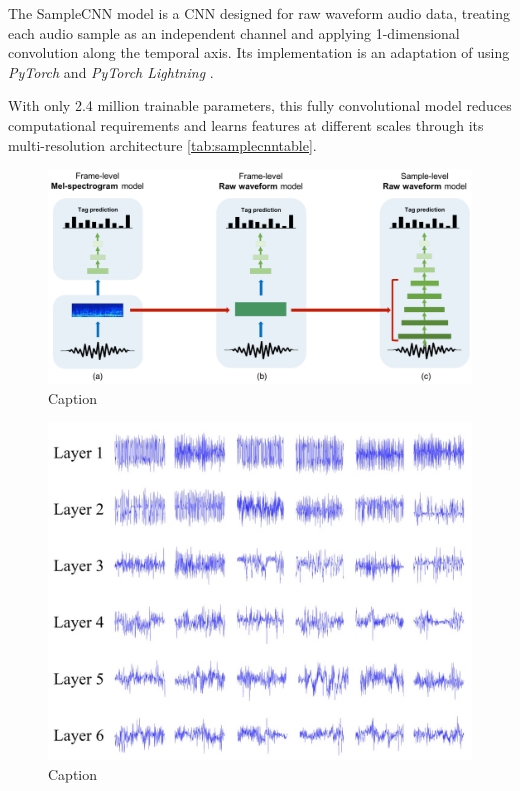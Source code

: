 The SampleCNN model \cite{Lee2018SampleCNN:Classification} is a CNN designed for raw waveform audio data, treating each audio sample as an independent channel and applying 1-dimensional convolution along the temporal axis. Its implementation is an adaptation of \cite{CLMR2021} using \textit{PyTorch} \cite{Paszke2019PyTorch:Library} and \textit{PyTorch Lightning} \cite{PyTorchDocumentation}.

With only 2.4 million trainable parameters, this fully convolutional model reduces computational requirements and learns features at different scales through its multi-resolution architecture \ref{tab:samplecnntable}.


\begin{figure}
    \centering
    \includegraphics{figures/images/applsci-08-00150-g001.png}
    \caption[SampleCNN]{Caption}
    \label{fig:samplecnn}
\end{figure}

\begin{figure}
    \centering
    \includegraphics{figures/images/applsci-08-00150-g002.png}
    \caption[SampleCNN]{Caption}
    \label{fig:filters}
\end{figure}

